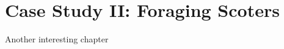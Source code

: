 \graphicspath{{fig/scoters/}}

\chapter{Case Study II: Foraging Scoters}
\label{cha:scoters}

Another interesting chapter
